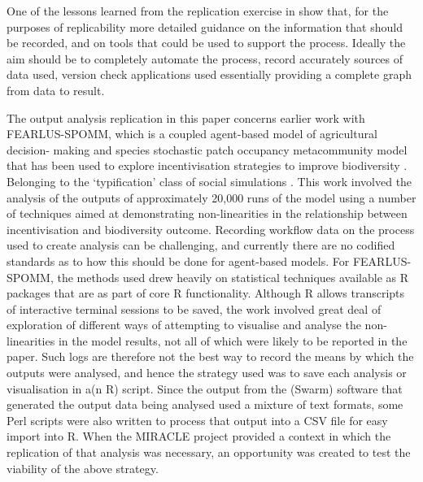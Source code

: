 \documentclass[runningheads]{llncs}
\begin{document}
One of the lessons learned from the replication exercise in
\cite{polhill2017lessons} show that, for the purposes of replicability more
detailed guidance on the information that should be recorded,  and on tools
that could be used to support the process. Ideally the aim should be to
completely automate the process, record accurately sources of data used,
version check applications used essentially providing a complete graph from
data to result.

The output analysis replication in this paper concerns earlier work with
FEARLUS-SPOMM, which is a coupled agent-based model of agricultural decision-
making and species stochastic patch occupancy metacommunity model that has been
used to explore incentivisation strategies to improve biodiversity
\cite{polhill_nonlinearities_2013,gimona2011exploring}. Belonging to the
‘typification’ class of social simulations  \cite{boero2005does}.  This work
involved the analysis of the outputs of approximately 20,000 runs of the model
using a number of techniques aimed at demonstrating non-linearities in the
relationship between incentivisation and biodiversity outcome.  Recording
workflow data on the process used to create analysis can be challenging, and
currently there are no codified standards as to how this should be done for
agent-based models. For FEARLUS-SPOMM, the methods used drew heavily on statistical
techniques available as R packages that are as part of core R functionality.
Although R allows transcripts of interactive terminal sessions to be saved, the
work involved great deal of exploration of different ways of attempting to
visualise and analyse the non-linearities in the model results, not all of
which were likely to be reported in the paper. Such logs are therefore not the
best way to record the means by which the outputs were analysed, and hence the
strategy used was to save each analysis or visualisation in a(n R) script.
Since the output from the (Swarm) software that generated the output data being
analysed used a mixture of text formats, some Perl scripts were also written to
process that output into a CSV file for easy import into R. When the MIRACLE
project \cite{parker2019final} provided a context in which the replication of
that analysis was necessary, an opportunity was created to test the viability
of the above strategy.
\end{document}
